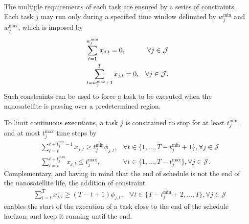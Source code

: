 The multiple requirements of each task are ensured by a series of constraints.
Each task $j$ may run only during a specified time window delimited by $w_{j}^{\text{min}}$ and $w_{j}^{\text{max}}$, which is imposed by
\begin{equation}\label{eq:window-constraints}
    \begin{aligned}
        &\sum_{t=1}^{\textcolor{black}{w^{\min}_{j}}} x_{j,t} = 0,  & \forall j\in\mathcal{J} \\
        &\sum_{t=w^{\max}_{j}+1}^{T} x_{j,t} = 0, & \forall j\in\mathcal{J}
    .\end{aligned}
\end{equation}
Such constraints can be used to force a task to be executed when the nanosatellite is passing over a predetermined region.

To limit continuous executions, a task $j$ is constrained to stop for at least $t_j^{\text{min}}$, and at most $t_j^{\text{max}}$ time steps by
\begin{equation}\label{eq:execution-gap-constraints}
    \begin{aligned}
        &\sum_{l=t}^{t+{t}^{\min}_{j}-1} x_{j,l} \geq {t}^{\min}_{j} \phi_{j,t},  &\forall t \in \{1,...,T-{t}^{\min}_{j} + 1\}, \forall j\in\mathcal{J} \\
        &\sum_{l=t}^{t+{t}^{\max}_{j}} x_{j,l} \leq {t}^{\max}_{j},  &\forall t \in \{1,...,T-{t}^{\max}_{j}\}, \forall j\in\mathcal{J}
    .\end{aligned}
\end{equation}
Complementary, and having in mind that the end of schedule is not the end of the nanosatellite life, the addition of constraint
\begin{equation}\label{eq:execution-end-constraints}
    \begin{aligned}
        &\sum_{l=t}^{T} x_{j,l} \geq (T - t + 1) \phi_{j,t},  & \forall t \in \{T-{t}^{\min}_{j} + 2,...,T\}, \forall j\in\mathcal{J}
    \end{aligned}
\end{equation}
enables the start of the execution of a task close to the end of the schedule horizon, and keep it running until the end.

